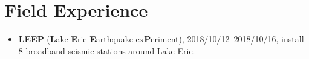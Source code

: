 \section{Field Experience}

\begin{itemize}
\item \textbf{LEEP} (\textbf{L}ake \textbf{E}rie \textbf{E}arthquake ex\textbf{P}eriment),
      2018/10/12--2018/10/16, install 8 broadband seismic stations around Lake Erie.
\end{itemize}
